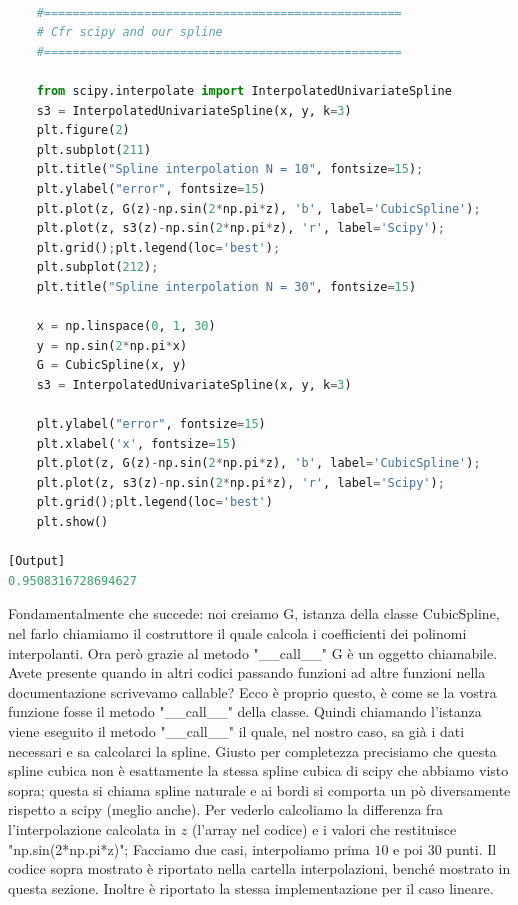 \documentclass[10pt,a4paper]{article}
\begin{document}
\begin{lstlisting}[language=Python]
        
    #==================================================
    # Cfr scipy and our spline
    #==================================================
    
    from scipy.interpolate import InterpolatedUnivariateSpline
    s3 = InterpolatedUnivariateSpline(x, y, k=3)
    plt.figure(2)
    plt.subplot(211)
    plt.title("Spline interpolation N = 10", fontsize=15);
    plt.ylabel("error", fontsize=15)
    plt.plot(z, G(z)-np.sin(2*np.pi*z), 'b', label='CubicSpline');
    plt.plot(z, s3(z)-np.sin(2*np.pi*z), 'r', label='Scipy');
    plt.grid();plt.legend(loc='best');
    plt.subplot(212);
    plt.title("Spline interpolation N = 30", fontsize=15)
    
    x = np.linspace(0, 1, 30)
    y = np.sin(2*np.pi*x)
    G = CubicSpline(x, y)
    s3 = InterpolatedUnivariateSpline(x, y, k=3)
    
    plt.ylabel("error", fontsize=15)
    plt.xlabel('x', fontsize=15)
    plt.plot(z, G(z)-np.sin(2*np.pi*z), 'b', label='CubicSpline');
    plt.plot(z, s3(z)-np.sin(2*np.pi*z), 'r', label='Scipy');
    plt.grid();plt.legend(loc='best')
    plt.show()

[Output]
0.9508316728694627
\end{lstlisting}
Fondamentalmente che succede: noi creiamo G, istanza della classe CubicSpline, nel farlo chiamiamo il costruttore il quale calcola i coefficienti dei polinomi interpolanti. Ora però grazie al metodo "\_\_call\_\_" G è un oggetto chiamabile. Avete presente quando in altri codici passando funzioni ad altre funzioni nella documentazione scrivevamo callable? Ecco è proprio questo, è come se la vostra funzione fosse il metodo "\_\_call\_\_" della classe. Quindi chiamando l'istanza viene eseguito il metodo "\_\_call\_\_" il quale, nel nostro caso, sa già i dati necessari e sa calcolarci la spline. Giusto per completezza precisiamo che questa spline cubica non è esattamente la stessa spline cubica di scipy che abbiamo visto sopra; questa si chiama spline naturale e ai bordi si comporta un pò diversamente rispetto a scipy (meglio anche). Per vederlo calcoliamo la differenza fra l'interpolazione calcolata in $z$ (l'array nel codice) e i valori che restituisce "np.sin(2*np.pi*z)"; Facciamo due casi, interpoliamo prima $10$ e poi $30$ punti. Il codice sopra mostrato è riportato nella cartella interpolazioni, benché mostrato in questa sezione. Inoltre è riportato la stessa implementazione per il caso lineare.
\end{document}

